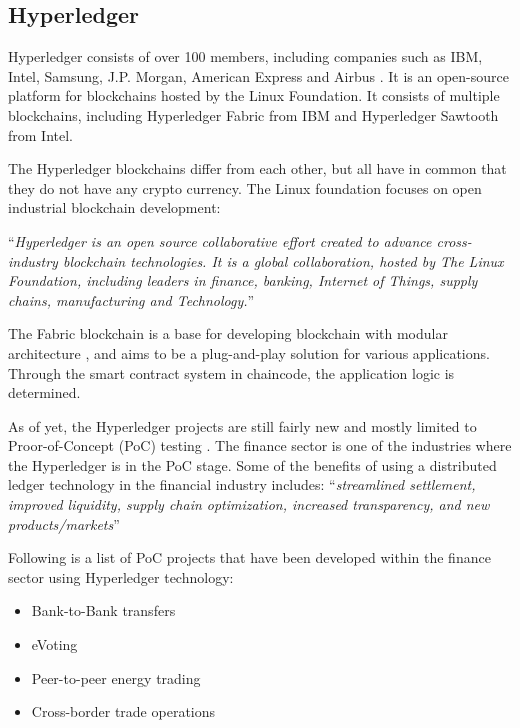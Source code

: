 \subsection{Hyperledger}
Hyperledger consists of over 100 members, including companies such as IBM, Intel, Samsung, J.P. Morgan, American Express and Airbus \cite{hyperledger}. It is an open-source platform for blockchains hosted by the Linux Foundation. It consists of multiple blockchains, including Hyperledger Fabric from IBM and Hyperledger Sawtooth from Intel. 

The Hyperledger blockchains differ from each other, but all have in common that they do not have any crypto currency. The Linux foundation focuses on open industrial blockchain development:

\enquote{\textit{Hyperledger is an open source collaborative effort created to advance cross-industry blockchain technologies. It is a global collaboration, hosted by The Linux Foundation, including leaders in finance, banking, Internet of Things, supply chains, manufacturing and Technology.}} \cite{hyperledger}

The Fabric blockchain is a base for developing blockchain with modular architecture \cite{fabric}, and aims to be a plug-and-play solution for various applications. Through the smart contract system in chaincode, the application logic is determined. 

As of yet, the Hyperledger projects are still fairly new and mostly limited to Proor-of-Concept (PoC) testing \cite{industries}. The finance sector is one of the industries where the Hyperledger is in the PoC stage. Some of the benefits of using a distributed ledger technology in the financial industry includes:
\enquote{\textit{streamlined settlement, improved liquidity, supply chain optimization, increased transparency, and new products/markets}}

Following is a list of PoC projects that have been developed within the finance sector using Hyperledger technology:

\begin{itemize}
\item Bank-to-Bank transfers \cite{bank}
\item eVoting \cite{evoting}
\item Peer-to-peer energy trading \cite{nadgrid}
\item Cross-border trade operations \cite{border}
\end{itemize}


